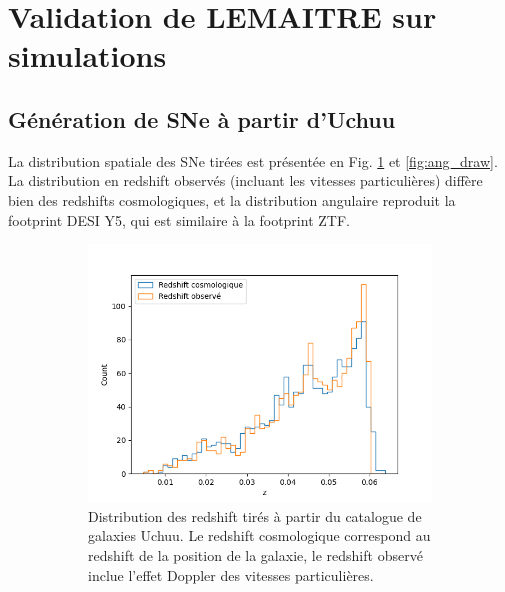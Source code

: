 \documentclass{book}
\begin{document}
\section{Validation de LEMAITRE sur simulations}

\subsection{Génération de SNe à partir d'Uchuu}

La distribution spatiale des SNe tirées est présentée en Fig. \ref{fig:z_draw} et \ref{fig:ang_draw}. La distribution en redshift observés (incluant les vitesses particulières) diffère bien des redshifts cosmologiques, et la distribution angulaire reproduit la footprint DESI Y5, qui est similaire à la footprint ZTF.

\begin{figure}
	\centering
	\begin{subfigure}[c]{0.45\textwidth}
		\includegraphics[width=\textwidth]{figures/redshift_draw.png}
		\caption{Distribution des redshift tirés à partir du catalogue de galaxies Uchuu. Le redshift cosmologique correspond au redshift de la position de la galaxie, le redshift observé inclue l'effet Doppler des vitesses particulières.}
		\label{fig:z_draw}
	\end{subfigure}
	\hfill
	\begin{subfigure}[c]{0.5\textwidth}
		\centering

\end{subfigure}
\end{figure}
\end{document}
